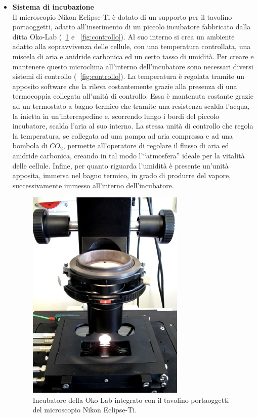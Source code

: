 \begin{itemize}
\item \textbf{Sistema di incubazione}\\
Il microscopio Nikon Eclipse-Ti è dotato di un supporto per il tavolino portaoggetti, adatto all'inserimento di un piccolo incubatore fabbricato dalla ditta Oko-Lab (\figurename~\ref{fig:okolab} e \figurename~\ref{fig:controllo}).
Al suo interno si crea un ambiente adatto alla sopravvivenza delle cellule, con una temperatura controllata, una miscela di aria e anidride carbonica ed un certo tasso di umidità.
Per creare e mantenere questo microclima all'interno dell'incubatore sono necessari diversi sistemi di controllo (\figurename~\ref{fig:controllo}). 
La temperatura è regolata tramite un apposito software che la rileva costantemente grazie alla presenza di una termocoppia collegata all'unità di controllo. 
Essa è mantenuta costante grazie ad un termostato a bagno termico che tramite una resistenza scalda l'acqua, la inietta in un'intercapedine e, scorrendo lungo i bordi del piccolo incubatore, scalda l'aria al suo interno.
La stessa unità di controllo che regola la temperatura, se collegata ad una pompa ad aria compressa e ad una bombola di $CO_2$, permette all'operatore di regolare il flusso di aria ed anidride carbonica, creando in tal modo l'``atmosfera'' ideale per la vitalità delle cellule.
Infine, per quanto riguarda l'umidità è presente un'unità apposita, immersa nel bagno termico, in grado di produrre del vapore, successivamente immesso all'interno dell'incubatore.

\begin{figure}
 \centering
 \includegraphics[scale=.30]{img/CAP2okolab.png}
 \caption{\small{Incubatore della Oko-Lab integrato con il tavolino portaoggetti del microscopio Nikon Eclipse-Ti.}}
 \label{fig:okolab}
\end{figure}


\end{itemize}
